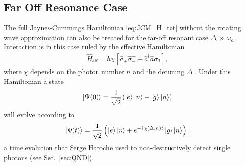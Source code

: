 \subsection{Far Off Resonance Case}
The full Jaynes-Cummings Hamiltonian \eqref{eq:JCM_H_tot} without the rotating
wave approximation can also be treated for the far-off resonant case
$\Delta\gg\omega_a$. Interaction is in this case ruled by the effective
Hamiltonian 
\begin{align}
  \label{eq:H_eff}
  \hat{H}_{\text{eff}} = \hbar \chi \left[\hat{\sigma}_+\hat{\sigma_-} +
  \hat{a}^\dagger \hat{a}\sigma_3 \right],
\end{align}
where $\chi$ depends on the photon number $n$ and the detuning $\Delta$
\cite{gerry2005introductory}. Under this Hamiltonian a state
\begin{align}
  \label{eq:psi_evol_0}
  \ket{\Psi(0)} = \frac{1}{\sqrt{2}} \left(\ket{e}\ket{n} +
  \ket{g}\ket{n}\right)
\end{align}
will evolve according to 
\begin{align}
  \label{eq:psi_evol_t}
  \ket{\Psi(t)} = \frac{1}{\sqrt{2}} \left( \ket{e}\ket{n} + e^{-i\,\chi
  (\Delta,n)t} \ket{g}\ket{n}\right),
\end{align}
a time evolution that Serge Haroche used to non-destructively detect single
photons (see Sec.~\ref{sec:QND}).
